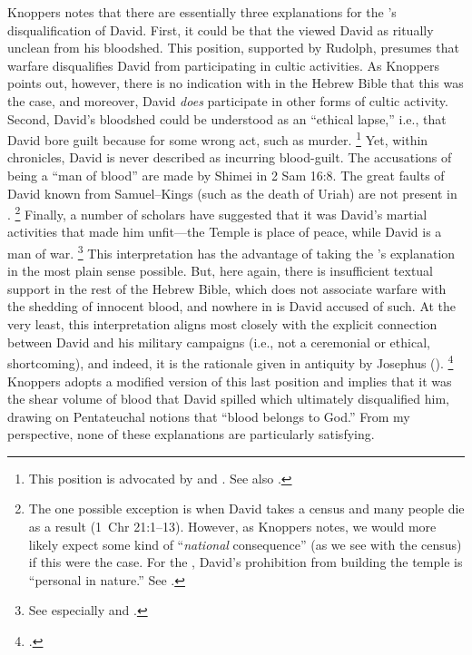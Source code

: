 Knoppers notes that there are essentially three explanations for the \chronicler's disqualification of David. First, it could be that the \chronicler viewed David as ritually unclean from his bloodshed. This position, supported by Rudolph,\autocite[151]{rudolph1955} presumes that warfare disqualifies David from participating in cultic activities. As Knoppers points out, however, there is no indication with in the Hebrew Bible that this was the case, and moreover, David \emph{does} participate in other forms of cultic activity.\autocite[772]{knoppers2007} Second, David's bloodshed could be understood as an ``ethical lapse,'' i.e., that David bore guilt because for some wrong act, such as murder.%
    \footnote{This position is advocated by \cite[53]{dirksen_jsot1996} and \cite{kelly_jsot1998}. See also \cite{braun_jbl1976}.}
Yet, within chronicles, David is never described as incurring blood-guilt. The accusations of being a ``man of blood'' are made by Shimei in 2 Sam 16:8. The great faults of David known from Samuel--Kings (such as the death of Uriah) are not present in \chronicles.%
    \footnote{The one possible exception is when David takes a census and many people die as a result (1~Chr 21:1--13). However, as Knoppers notes, we would more likely expect some kind of ``\emph{national} consequence'' (as we see with the census) if this were the case. For the \chronicler, David's prohibition from building the temple is ``personal in nature.'' See \cite[772--773]{knoppers2007}.}
Finally, a number of scholars have suggested that it was David's martial activities that made him unfit---the Temple is place of peace, while David is a man of war.%
    \footnote{See especially \cite[396--397]{japhet1993} and \cite{mckenzie_graham-etal1999}.}
This interpretation has the advantage of taking the \chronicler's explanation in the most plain sense possible. But, here again, there is insufficient textual support in the rest of the Hebrew Bible, which does not associate warfare with the shedding of innocent blood, and nowhere in \chronicles is David accused of such. At the very least, this interpretation aligns most closely with the explicit connection between David and his military campaigns (i.e., not a ceremonial or ethical, shortcoming), and indeed, it is the rationale given in antiquity by Josephus ().%
    \footnote{\cite[773]{knoppers2007}.}
Knoppers adopts a modified version of this last position and implies that it was the shear volume of blood that David spilled which ultimately disqualified him, drawing on Pentateuchal notions that ``blood belongs to God.''\autocite[774]{knoppers2007} From my perspective, none of these explanations are particularly satisfying. 

